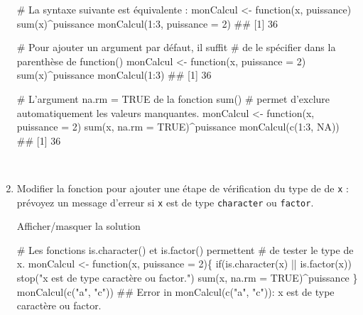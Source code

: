\documentclass[12pt,]{article}
\newenvironment{Shaded}{}{}
\newcommand{\KeywordTok}[1]{\textcolor[rgb]{0.00,0.00,1.00}{{#1}}}
\newcommand{\DataTypeTok}[1]{{#1}}
\newcommand{\DecValTok}[1]{{#1}}
\newcommand{\StringTok}[1]{\textcolor[rgb]{0.00,0.50,0.50}{{#1}}}
\newcommand{\CommentTok}[1]{\textcolor[rgb]{0.00,0.50,0.00}{{#1}}}
\newcommand{\OtherTok}[1]{\textcolor[rgb]{1.00,0.25,0.00}{{#1}}}
\newcommand{\NormalTok}[1]{{#1}}
\begin{document}
\begin{enumerate}
\begin{Shaded}
\begin{Highlighting}[]
\CommentTok{# La syntaxe suivante est équivalente : }
\NormalTok{monCalcul <-}\StringTok{ }\NormalTok{function(x, puissance) }\KeywordTok{sum}\NormalTok{(x)^puissance}
\KeywordTok{monCalcul}\NormalTok{(}\DecValTok{1}\NormalTok{:}\DecValTok{3}\NormalTok{, }\DataTypeTok{puissance =} \DecValTok{2}\NormalTok{)}
\NormalTok{## [1] 36}

\CommentTok{# Pour ajouter un argument par défaut, il suffit }
\CommentTok{# de le spécifier dans la parenthèse de function()}
\NormalTok{monCalcul <-}\StringTok{ }\NormalTok{function(x, }\DataTypeTok{puissance =} \DecValTok{2}\NormalTok{) }\KeywordTok{sum}\NormalTok{(x)^puissance}
\KeywordTok{monCalcul}\NormalTok{(}\DecValTok{1}\NormalTok{:}\DecValTok{3}\NormalTok{)}
\NormalTok{## [1] 36}

\CommentTok{# L'argument na.rm = TRUE de la fonction sum()}
\CommentTok{# permet d'exclure automatiquement les valeurs manquantes.}
\NormalTok{monCalcul <-}\StringTok{ }\NormalTok{function(x, }\DataTypeTok{puissance =} \DecValTok{2}\NormalTok{) }\KeywordTok{sum}\NormalTok{(x, }\DataTypeTok{na.rm =} \OtherTok{TRUE}\NormalTok{)^puissance}
\KeywordTok{monCalcul}\NormalTok{(}\KeywordTok{c}\NormalTok{(}\DecValTok{1}\NormalTok{:}\DecValTok{3}\NormalTok{, }\OtherTok{NA}\NormalTok{))}
\NormalTok{## [1] 36}
\end{Highlighting}
\end{Shaded}

  ~
\item
  Modifier la fonction pour ajouter une étape de vérification du type de
  de \texttt{x} : prévoyez un message d'erreur si \texttt{x} est de type
  \texttt{character} ou \texttt{factor}.

  Afficher/masquer la solution

  \hypertarget{sol17}{}
\begin{Shaded}
\begin{Highlighting}[]
\CommentTok{# Les fonctions is.character() et is.factor() permettent}
\CommentTok{# de tester le type de x. }
\NormalTok{monCalcul <-}\StringTok{ }\NormalTok{function(x, }\DataTypeTok{puissance =} \DecValTok{2}\NormalTok{)\{}
  \NormalTok{if(}\KeywordTok{is.character}\NormalTok{(x) ||}\StringTok{ }\KeywordTok{is.factor}\NormalTok{(x)) }\KeywordTok{stop}\NormalTok{(}\StringTok{"x est de type caractère ou factor."}\NormalTok{)}
  \KeywordTok{sum}\NormalTok{(x, }\DataTypeTok{na.rm =} \OtherTok{TRUE}\NormalTok{)^puissance}
\NormalTok{\}}
\KeywordTok{monCalcul}\NormalTok{(}\KeywordTok{c}\NormalTok{(}\StringTok{"a"}\NormalTok{, }\StringTok{"c"}\NormalTok{))}
\NormalTok{## Error in monCalcul(c("a", "c")): x est de type caractère ou factor.}
\end{Highlighting}
\end{Shaded}


\end{enumerate}
\end{document}
